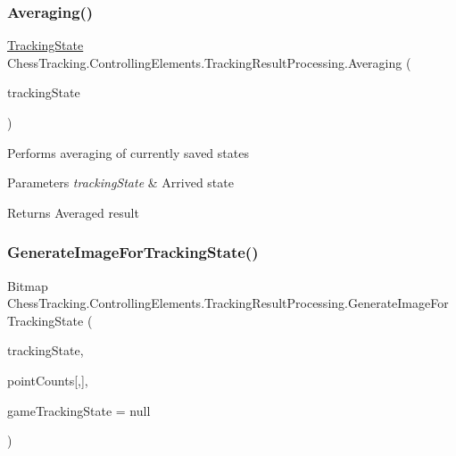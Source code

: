 \subsubsection{\texorpdfstring{Averaging()}{Averaging()}}
{\footnotesize\ttfamily \mbox{\hyperlink{class_chess_tracking_1_1_multithreading_messages_1_1_tracking_state}{Tracking\+State}} Chess\+Tracking.\+Controlling\+Elements.\+Tracking\+Result\+Processing.\+Averaging (\begin{DoxyParamCaption}\item[{\mbox{\hyperlink{class_chess_tracking_1_1_multithreading_messages_1_1_tracking_state}{Tracking\+State}}}]{tracking\+State }\end{DoxyParamCaption})\hspace{0.3cm}{\ttfamily [private]}}



Performs averaging of currently saved states 


\begin{DoxyParams}{Parameters}
{\em tracking\+State} & Arrived state\\
\hline
\end{DoxyParams}
\begin{DoxyReturn}{Returns}
Averaged result
\end{DoxyReturn}
\mbox{\label{class_chess_tracking_1_1_controlling_elements_1_1_tracking_result_processing_a2924b01cfd6f25bc056d62a87144e147}} 
\subsubsection{\texorpdfstring{GenerateImageForTrackingState()}{GenerateImageForTrackingState()}}
{\footnotesize\ttfamily Bitmap Chess\+Tracking.\+Controlling\+Elements.\+Tracking\+Result\+Processing.\+Generate\+Image\+For\+Tracking\+State (\begin{DoxyParamCaption}\item[{\mbox{\hyperlink{class_chess_tracking_1_1_multithreading_messages_1_1_tracking_state}{Tracking\+State}}}]{tracking\+State,  }\item[{int}]{point\+Counts\mbox{[},\mbox{]},  }\item[{\mbox{\hyperlink{class_chess_tracking_1_1_multithreading_messages_1_1_tracking_state}{Tracking\+State}}}]{game\+Tracking\+State = {\ttfamily null} }\end{DoxyParamCaption})\hspace{0.3cm}{\ttfamily [private]}}



